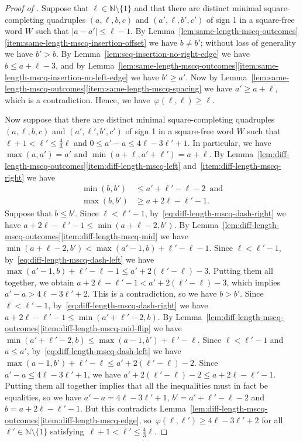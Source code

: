 \documentclass[12pt]{article}
\theoremstyle{plain}
\theoremstyle{definition}
\newcommand\N{\mathbb{N}}
\newcommand{\f}{\varphi}
\newcommand{\sm}{\setminus}
\begin{document}
	\begin{proof}[Proof of ]
		Suppose that $\ell\in\N\setminus\{1\}$ and that there are distinct minimal square-completing quadruples $(a,\ell,b,c)$ and $(a',\ell,b',c')$ of sign 1 in a square-free word $W$ such that $|a-a'|\le\ell-1$. By Lemma~\ref{lem:same-length-mscq-outcomes}\ref{item:same-length-mscq-insertion-offset} we have $b\ne b'$; without loss of generality we have $b'>b$. By Lemma~\ref{lem:scq-insertion-no-right-edge} we have $b\le a+\ell-3$, and by Lemma~\ref{lem:same-length-mscq-outcomes}\ref{item:same-length-mscq-insertion-no-left-edge} we have $b'\ge a'$. Now by Lemma~\ref{lem:same-length-mscq-outcomes}\ref{item:same-length-mscq-spacing} we have $a'\ge a+\ell$, which is a contradiction. Hence, we have~$\f(\ell,\ell)\ge\ell$.
		
		Now suppose that there are distinct minimal square-completing quadruples $(a,\ell,b,c)$ and $(a',\ell',b',c')$ of sign 1 in a square-free word $W$ such that $\ell+1<\ell'\le\frac{4}{3}\ell$ and $0\le a'-a\le4\ell-3\ell'+1$. In particular, we have $\max(a,a')=a'$ and $\min(a+\ell,a'+\ell')=a+\ell$. By Lemma~\ref{lem:diff-length-mscq-outcomes}\ref{item:diff-length-mscq-left} and~\ref{item:diff-length-mscq-right} we have
		\begin{align}
			\min(b,b')&\le a'+\ell'-\ell-2\,\textrm{ and} \label{eq:diff-length-mscq-dash-left} \\
			\max(b,b')&\ge a+2\ell-\ell'-1. \, \label{eq:diff-length-mscq-dash-right}
		\end{align}
		Suppose that $b\le b'$. Since $\ell<\ell'-1$, by~\eqref{eq:diff-length-mscq-dash-right} we have $a+2\ell-\ell'-1\le \min(a+\ell-2,b')$. By Lemma~\ref{lem:diff-length-mscq-outcomes}\ref{item:diff-length-mscq-mid} we have $\min(a+\ell-2,b') < \max(a'-1,b)+\ell'-\ell-1$. Since $\ell<\ell'-1$, by~\eqref{eq:diff-length-mscq-dash-left} we have $\max(a'-1,b)+\ell'-\ell-1\le a'+2(\ell'-\ell)-3$. Putting them all together, we obtain $a+2\ell-\ell'-1<a'+2(\ell'-\ell)-3$, which implies $a'-a>4\ell-3\ell'+2$. This is a contradiction, so we have $b>b'$. Since $\ell<\ell'-1$, by~\eqref{eq:diff-length-mscq-dash-right} we have $a+2\ell-\ell'-1\le \min(a'+\ell'-2,b)$. By Lemma~\ref{lem:diff-length-mscq-outcomes}\ref{item:diff-length-mscq-mid-flip} we have $\min(a'+\ell'-2,b) \le \max(a-1,b')+\ell'-\ell$. Since $\ell<\ell'-1$ and $a\le a'$, by~\eqref{eq:diff-length-mscq-dash-left} we have $\max(a-1,b')+\ell'-\ell\le a'+2(\ell'-\ell)-2$. Since $a'-a\le4\ell-3\ell'+1$, we have $a'+2(\ell'-\ell)-2 \le a+2\ell-\ell'-1$. Putting them all together implies that all the inequalities must in fact be equalities, so we have $a'-a=4\ell-3\ell'+1$, $b'=a'+\ell'-\ell-2$ and $b=a+2\ell-\ell'-1$. But this contradicts Lemma~\ref{lem:diff-length-mscq-outcomes}\ref{item:diff-length-mscq-edge}, so~$\f(\ell,\ell') \ge 4\ell-3\ell'+2$ for all~$\ell'\in\N\sm\{1\}$ satisfying~$\ell+1<\ell'\le\frac{4}{3}\ell$.
		

\end{proof}
\end{document}

